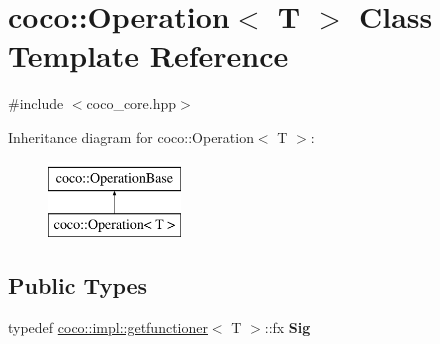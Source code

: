\hypertarget{classcoco_1_1_operation}{}\section{coco\+:\+:Operation$<$ T $>$ Class Template Reference}
\label{classcoco_1_1_operation}


{\ttfamily \#include $<$coco\+\_\+core.\+hpp$>$}

Inheritance diagram for coco\+:\+:Operation$<$ T $>$\+:\begin{figure}[H]
\begin{center}
\leavevmode
\includegraphics[height=2.000000cm]{classcoco_1_1_operation}
\end{center}
\end{figure}
\subsection*{Public Types}
\begin{DoxyCompactItemize}
\item 
\hypertarget{classcoco_1_1_operation_a5d535eef83aa091a4b2e36cf7114f677}{}typedef \hyperlink{structcoco_1_1impl_1_1getfunctioner}{coco\+::impl\+::getfunctioner}$<$ T $>$\+::fx {\bfseries Sig}\label{classcoco_1_1_operation_a5d535eef83aa091a4b2e36cf7114f677}

\end{DoxyCompactItemize}
